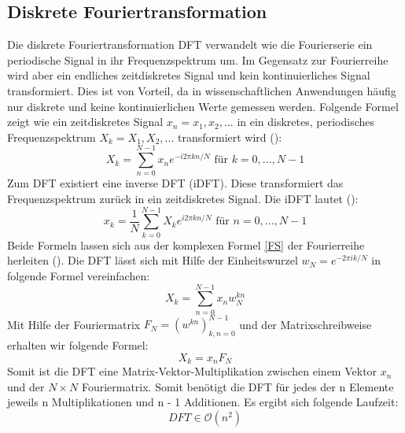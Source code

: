 \subsection{Diskrete Fouriertransformation}
Die diskrete Fouriertransformation DFT verwandelt wie die Fourierserie ein periodische Signal in ihr Frequenzspektrum um. Im Gegensatz zur Fourierreihe wird aber ein endliches zeitdiskretes Signal und kein kontinuierliches Signal transformiert.
Dies ist von Vorteil, da in wissenschaftlichen Anwendungen häufig nur diskrete und keine kontinuierlichen Werte gemessen werden.
Folgende Formel zeigt wie ein zeitdiskretes Signal $x_{n} = x_{1}, x_{2},...$ in ein diskretes, periodisches Frequenzspektrum $X_{k} = X_{1}, X_{2},...$ transformiert wird (\cite[S.17]{and 12}):
\begin{equation}
X_{k}= \sum_{n=0}^{N-1} x_{n} e^{-i2 \pi kn /N} \text{  für } k=0,...,N-1
\label{eq:DFT}
\end{equation}
Zum DFT existiert eine inverse DFT (iDFT). Diese transformiert das Frequenzspektrum zurück in ein zeitdiskretes Signal.
Die iDFT lautet (\cite[S.20]{and 12}):
\begin{equation}
x_{k}= \frac{1}{N}\sum_{k=0}^{N-1} X_{k} e^{i2 \pi kn /N} \text{  für }  n=0,...,N-1
\label{idft}
\end{equation}
Beide Formeln lassen sich aus der komplexen Formel \ref{FS} der Fourierreihe herleiten (\cite[S. 77-79]{ser 17}). Die DFT lässt sich mit Hilfe der Einheitswurzel $w_{N} = e^{-2 \pi ik /N}$ in folgende Formel vereinfachen:
\begin{equation}
X_{k}= \sum_{n=0}^{N-1} x_{n} w_{N}^{kn}
\end{equation}
Mit Hilfe der Fouriermatrix $F_{N} = (w^{kn})_{k,n=0}^{N-1}$ und der Matrixschreibweise erhalten wir folgende Formel:
\begin{equation}
X_{k} = x_{n}F_{N}
\label{eq:dft fouriermatrix}
\end{equation}
Somit ist die DFT eine Matrix-Vektor-Multiplikation zwischen einem Vektor $x_n$ und der $N \times N$ Fouriermatrix.
Somit benötigt die DFT für jedes der n Elemente jeweils n Multiplikationen und  n - 1 Additionen. Es ergibt sich folgende Laufzeit: 
\begin{equation}
DFT \in \mathcal O(n^2)
\end{equation}

